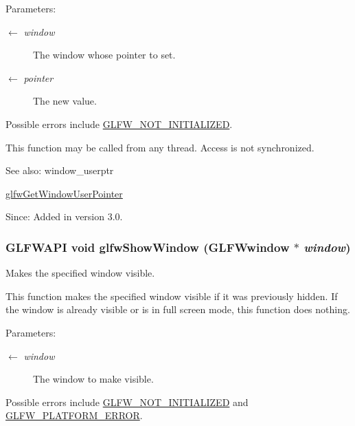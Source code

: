 \begin{Desc}
\item[Parameters:]
\begin{description}
\item[\mbox{$\leftarrow$} {\em window}]The window whose pointer to set. \item[\mbox{$\leftarrow$} {\em pointer}]The new value.\end{description}
\end{Desc}
Possible errors include \hyperlink{group__errors_g2374ee02c177f12e1fa76ff3ed15e14a}{GLFW\_\-NOT\_\-INITIALIZED}.

This function may be called from any thread. Access is not synchronized.

\begin{Desc}
\item[See also:]window\_\-userptr 

\hyperlink{group__window_g0a9ff3b4bf8589e9518e8816d06a8f50}{glfwGetWindowUserPointer}\end{Desc}
\begin{Desc}
\item[Since:]Added in version 3.0. \end{Desc}
\hypertarget{group__window_g7945bcdff9e5e058cf36505d6873ed8c}{
\subsubsection[glfwShowWindow]{\setlength{\rightskip}{0pt plus 5cm}GLFWAPI void glfwShowWindow ({\bf GLFWwindow} $\ast$ {\em window})}}
\label{group__window_g7945bcdff9e5e058cf36505d6873ed8c}


Makes the specified window visible. 

This function makes the specified window visible if it was previously hidden. If the window is already visible or is in full screen mode, this function does nothing.

\begin{Desc}
\item[Parameters:]
\begin{description}
\item[\mbox{$\leftarrow$} {\em window}]The window to make visible.\end{description}
\end{Desc}
Possible errors include \hyperlink{group__errors_g2374ee02c177f12e1fa76ff3ed15e14a}{GLFW\_\-NOT\_\-INITIALIZED} and \hyperlink{group__errors_gd44162d78100ea5e87cdd38426b8c7a1}{GLFW\_\-PLATFORM\_\-ERROR}.

